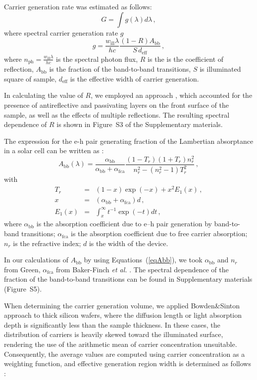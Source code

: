 \documentclass{WileyMSP-template}
\begin{document}
Carrier generation rate was estimated as follows:
\begin{equation}
\label{eqGint}
G=\int g(\lambda) d\lambda\,,
\end{equation}
where spectral carrier generation rate $g$
\begin{equation}
\label{eqGint}
g=\frac{w_\mathrm{ill}\lambda}{hc}\frac{(1-R)A_\mathrm{bb}}{S\,d_\mathrm{eff}}\,,
\end{equation}
where $n_\mathrm{ph}=\frac{w_\mathrm{ill}\lambda}{hc}$ is the spectral photon flux,
$R$ is the is the coefficient of reflection,
$A_\mathrm{bb}$ is the fraction of the band-to-band transitions,
$S$ is illuminated square of sample,
$d_\mathrm{eff}$ is the effective width of carrier generation.

In calculating the value of $R$, we employed an approach \cite{KostRefl2000},
which accounted for the presence of antireflective and passivating layers on the front surface of the sample,
as well as the effects of multiple reflections.
The resulting spectral dependence of $R$ is shown in Figure~S3 of the Supplementary materials.

The expression for the e-h pair generating fraction of the Lambertian absorptance in a solar cell
can be written as \cite{Schaefer2018}:
\begin{equation}
\label{eqAbb}
A_\mathrm{bb}(\lambda)=\frac{\alpha_\mathrm{bb}}{\alpha_\mathrm{bb}+\alpha_\mathrm{fca}}\frac{(1-T_r)(1+T_r)n_r^2}{n_r^2-(n_r^2-1)T_r^2}\,,
\end{equation}
with
\begin{eqnarray*}
T_r&=&(1-x)\exp(-x)+x^2E_1(x)\,,\\
x&=&(\alpha_\mathrm{bb}+\alpha_\mathrm{fca})d\,,\\
E_1(x)&=&\int_x^\infty t^{-1}\exp(-t)dt\,,
\end{eqnarray*}
where
$\alpha_\mathrm{bb}$ is the absorption coefficient due to e–h pair
generation by band-to-band transitions;
$\alpha_\mathrm{fca}$ is the absorption coefficient due to free carrier absorption;
$n_r$ is the refractive index;
$d$ is the width of the device.

In our calculations of $A_\mathrm{bb}$ by using Equations~(\ref{eqAbb}), we took  $\alpha_\mathrm{bb}$ and
$n_r$ from Green\cite{Green2022}, $\alpha_\mathrm{fca}$  from Baker-Finch \emph{et al.} \cite{SiFCA}.
The spectral dependence of the fraction of the band-to-band transitions can be found in Supplementary materials (Figure~S5).

When determining the carrier generation volume, we applied Bowden\&Sinton  approach \cite{Bowden2007} to thick silicon wafers,
where the diffusion length or light absorption depth is significantly less than the sample thickness.
In these cases, the distribution of carriers is heavily skewed toward the illuminated surface,
rendering the use of the arithmetic mean of carrier concentration unsuitable.
Consequently, the average values are computed using carrier concentration as a weighting function,
and effective generation region width is determined as follows \cite{Bowden2007}:
\end{document}
